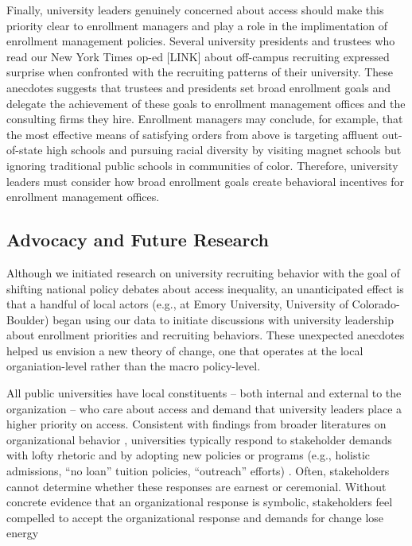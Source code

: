 \documentclass[twoside]{article}
\begin{document}
Finally, university leaders genuinely concerned about access should make this priority clear to enrollment managers and play a role in the implimentation of enrollment management policies.  Several university presidents and trustees who read our New York Times op-ed [LINK] about off-campus recruiting expressed surprise when confronted with the recruiting patterns of their university.  These anecdotes suggests that trustees and presidents set broad enrollment goals and delegate the achievement of these goals to enrollment management offices and the consulting firms they hire. Enrollment managers may conclude, for example, that the most effective means of satisfying orders from above is targeting affluent out-of-state high schools and pursuing racial diversity by visiting magnet schools but ignoring traditional public schools in communities of color.  Therefore, university leaders must consider how broad enrollment goals create behavioral incentives for enrollment management offices.


\subsection*{Advocacy and Future Research}

Although we initiated research on university recruiting behavior with the goal of shifting national policy debates about access inequality, an unanticipated effect is that a handful of local actors (e.g., at Emory University, University of Colorado-Boulder) began using our data to initiate discussions with university leadership about enrollment priorities and recruiting behaviors.  These unexpected anecdotes helped us envision a new theory of change, one that operates at the local organiation-level rather than the macro policy-level.

All public universities have local constituents -- both internal and external to the organization -- who care about access and demand that university leaders place a higher priority on access.  Consistent with findings from broader literatures on organizational behavior \citep{RN2436}, universities typically respond to stakeholder demands with lofty rhetoric and by adopting new policies or programs (e.g., holistic admissions, ``no loan'' tuition policies, ``outreach'' efforts) \citep[e.g., ][]{RN4017}.  Often, stakeholders cannot determine whether these responses are earnest or ceremonial. Without concrete evidence that an organizational response is symbolic, stakeholders feel compelled to accept the organizational response and demands for change lose energy
\end{document}
